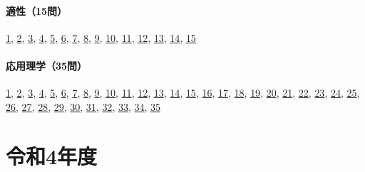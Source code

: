 \paragraph{適性（15問）} \hyperref[q:r03-reg-apt-01]{1}, \hyperref[q:r03-reg-apt-02]{2}, \hyperref[q:r03-reg-apt-03]{3}, \hyperref[q:r03-reg-apt-04]{4}, \hyperref[q:r03-reg-apt-05]{5}, \hyperref[q:r03-reg-apt-06]{6}, \hyperref[q:r03-reg-apt-07]{7}, \hyperref[q:r03-reg-apt-08]{8}, \hyperref[q:r03-reg-apt-09]{9}, \hyperref[q:r03-reg-apt-10]{10}, \hyperref[q:r03-reg-apt-11]{11}, \hyperref[q:r03-reg-apt-12]{12}, \hyperref[q:r03-reg-apt-13]{13}, \hyperref[q:r03-reg-apt-14]{14}, \hyperref[q:r03-reg-apt-15]{15}
\paragraph{応用理学（35問）} \hyperref[q:r03-reg-applied-01]{1}, \hyperref[q:r03-reg-applied-02]{2}, \hyperref[q:r03-reg-applied-03]{3}, \hyperref[q:r03-reg-applied-04]{4}, \hyperref[q:r03-reg-applied-05]{5}, \hyperref[q:r03-reg-applied-06]{6}, \hyperref[q:r03-reg-applied-07]{7}, \hyperref[q:r03-reg-applied-08]{8}, \hyperref[q:r03-reg-applied-09]{9}, \hyperref[q:r03-reg-applied-10]{10}, \hyperref[q:r03-reg-applied-11]{11}, \hyperref[q:r03-reg-applied-12]{12}, \hyperref[q:r03-reg-applied-13]{13}, \hyperref[q:r03-reg-applied-14]{14}, \hyperref[q:r03-reg-applied-15]{15}, \hyperref[q:r03-reg-applied-16]{16}, \hyperref[q:r03-reg-applied-17]{17}, \hyperref[q:r03-reg-applied-18]{18}, \hyperref[q:r03-reg-applied-19]{19}, \hyperref[q:r03-reg-applied-20]{20}, \hyperref[q:r03-reg-applied-21]{21}, \hyperref[q:r03-reg-applied-22]{22}, \hyperref[q:r03-reg-applied-23]{23}, \hyperref[q:r03-reg-applied-24]{24}, \hyperref[q:r03-reg-applied-25]{25}, \hyperref[q:r03-reg-applied-26]{26}, \hyperref[q:r03-reg-applied-27]{27}, \hyperref[q:r03-reg-applied-28]{28}, \hyperref[q:r03-reg-applied-29]{29}, \hyperref[q:r03-reg-applied-30]{30}, \hyperref[q:r03-reg-applied-31]{31}, \hyperref[q:r03-reg-applied-32]{32}, \hyperref[q:r03-reg-applied-33]{33}, \hyperref[q:r03-reg-applied-34]{34}, \hyperref[q:r03-reg-applied-35]{35}
\section{令和4年度}
